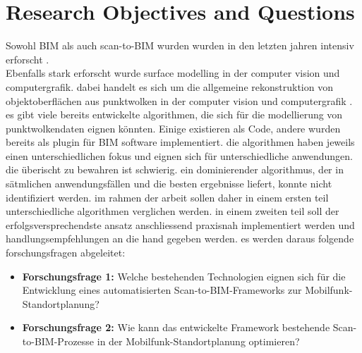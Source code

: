 \section{Research Objectives and Questions}
\begin{German}
    Sowohl BIM als auch scan-to-BIM wurden wurden in den letzten jahren intensiv erforscht \cite{rochaSurveyScantoBIMPractices2021}. \\
    Ebenfalls stark erforscht wurde surface modelling in der computer vision und computergrafik. dabei handelt es sich um die allgemeine rekonstruktion von objektoberflächen aus punktwolken in der computer vision und computergrafik \cite{nanPolyFitPolygonalSurface2017}. \\
    es gibt viele bereits entwickelte algorithmen, die sich für die modellierung von punktwolkendaten eignen könnten. Einige existieren als Code, andere wurden bereits als plugin für BIM software implementiert. die algorithmen haben jeweils einen unterschiedlichen fokus und eignen sich für unterschiedliche anwendungen. die überischt zu bewahren ist schwierig. ein dominierender algorithmus, der in sätmlichen anwendungsfällen und die besten ergebnisse liefert, konnte nicht identifiziert werden. im rahmen der arbeit sollen daher in einem ersten teil unterschiedliche algorithmen verglichen werden. in einem zweiten teil soll der erfolgsversprechendste ansatz anschliessend praxisnah implementiert werden und handlungsempfehlungen an die hand gegeben werden. es werden daraus folgende forschungsfragen abgeleitet:\\

    \begin{itemize}
        \item \textbf{Forschungsfrage 1:} Welche bestehenden Technologien eignen sich für die Entwicklung eines automatisierten Scan-to-BIM-Frameworks zur Mobilfunk-Standortplanung?
        \item \textbf{Forschungsfrage 2:} Wie kann das entwickelte Framework bestehende Scan-to-BIM-Prozesse in der Mobilfunk-Standortplanung optimieren?
    \end{itemize}
\end{German}

